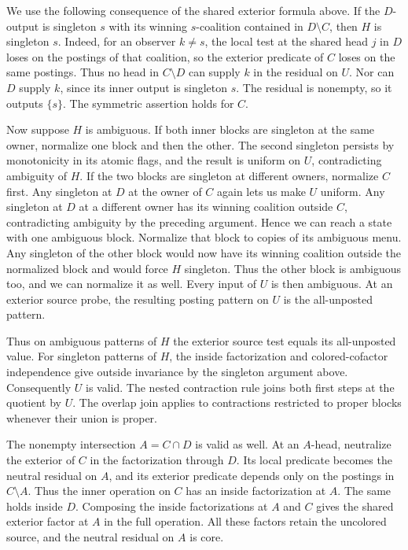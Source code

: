 We use the following consequence of the shared
exterior formula above. If the $D$-output is singleton
$s$ with its winning $s$-coalition contained in
$D\setminus C$, then $H$ is singleton $s$. Indeed,
for an observer $k\ne s$, the local test at the shared
head $j$ in $D$ loses on the postings of that
coalition, so the exterior predicate of $C$ loses
on the same postings. Thus no head in $C\setminus D$
can supply $k$ in the residual on $U$. Nor can $D$
supply $k$, since its inner output is singleton
$s$. The residual is nonempty, so it outputs
$\{s\}$. The symmetric assertion holds for $C$.

Now suppose $H$ is ambiguous. If both inner blocks
are singleton at the same owner, normalize one
block and then the other. The second singleton
persists by monotonicity in its atomic flags,
and the result is uniform on $U$, contradicting
ambiguity of $H$. If the two blocks are singleton
at different owners, normalize $C$ first. Any
singleton at $D$ at the owner of $C$ again lets
us make $U$ uniform. Any singleton at $D$ at a
different owner has its winning coalition outside
$C$, contradicting ambiguity by the preceding
argument. Hence we can reach a state with one
ambiguous block. Normalize that block to copies
of its ambiguous menu. Any singleton of the other
block would now have its winning coalition outside
the normalized block and would force $H$ singleton.
Thus the other block is ambiguous too, and we can
normalize it as well. Every input of $U$ is then
ambiguous. At an exterior source probe, the resulting
posting pattern on $U$ is the all-unposted pattern.

Thus on ambiguous patterns of $H$ the exterior
source test equals its all-unposted value. For
singleton patterns of $H$, the inside factorization
and colored-cofactor independence give outside
invariance by the singleton argument above.
Consequently $U$ is valid. The nested contraction
rule joins both first steps at the quotient by $U$.
The overlap join applies to contractions restricted
to proper blocks whenever their union is proper.

The nonempty intersection $A=C\cap D$ is valid as
well. At an $A$-head, neutralize the exterior of $C$
in the factorization through $D$. Its local predicate
becomes the neutral residual on $A$, and its exterior
predicate depends only on the postings in $C\setminus A$.
Thus the inner operation on $C$ has an inside
factorization at $A$. The same holds inside $D$.
Composing the inside factorizations at $A$ and $C$
gives the shared exterior factor at $A$ in the full
operation. All these factors retain the uncolored
source, and the neutral residual on $A$ is core.

